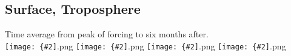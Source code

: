 \documentclass[12pt,a4paper]{article}
\newcommand{\pngfig}[2][0.5]{\texttt{[image: \{\#2]}.png}}
\begin{document}
\section{}

\subsection{Surface, Troposphere}
Time average from peak of forcing to six months after.\\
\pngfig[0.5]{comp_Tmax_300}
\pngfig[0.5]{comp_Tmax_sfc}
\pngfig[0.5]{comp_Tmin_300}
\pngfig[0.5]{comp_Tmin_sfc}
\end{document}
